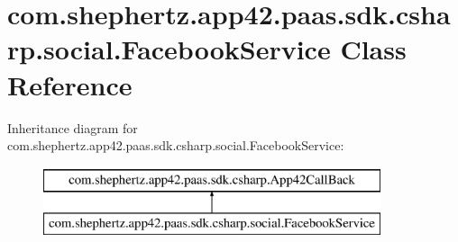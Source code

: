 \hypertarget{classcom_1_1shephertz_1_1app42_1_1paas_1_1sdk_1_1csharp_1_1social_1_1_facebook_service}{\section{com.\+shephertz.\+app42.\+paas.\+sdk.\+csharp.\+social.\+Facebook\+Service Class Reference}
\label{classcom_1_1shephertz_1_1app42_1_1paas_1_1sdk_1_1csharp_1_1social_1_1_facebook_service}
}
Inheritance diagram for com.\+shephertz.\+app42.\+paas.\+sdk.\+csharp.\+social.\+Facebook\+Service\+:\begin{figure}[H]
\begin{center}
\leavevmode
\includegraphics[height=2.000000cm]{classcom_1_1shephertz_1_1app42_1_1paas_1_1sdk_1_1csharp_1_1social_1_1_facebook_service}
\end{center}
\end{figure}
